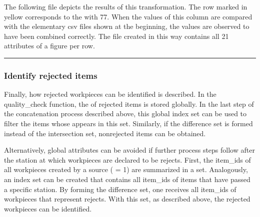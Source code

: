 \documentclass[letterpaper,10pt,english]{sphinxmanual}
\begin{document}
\sphinxAtStartPar
The following file depicts the results of this transformation. The row marked in yellow corresponds to the  with
 77. When the values of this column are compared with the elementary csv files shown at the beginning, the
values are observed to have been combined correctly. The file created in this way contains all 21 attributes of a figure
per row.



\bigskip\hrule\bigskip



\subsubsection{Identify rejected items}
\label{\detokenize{source/Examples/example04:identify-rejected}}\label{\detokenize{source/Examples/example04:identify-rejected-items}}
\sphinxAtStartPar
Finally, how rejected workpieces can be identified is described. In the quality\_check function, the  of
rejected items is stored globally. In the last step of the concatenation process described above, this global index set
can be used to filter the items whose  appears in this set. Similarly, if the difference set is formed instead
of the intersection set, nonrejected items can be obtained.

\sphinxAtStartPar
Alternatively, global attributes can be avoided if further process steps follow after the station at which workpieces
are declared to be rejects. First, the item\_ids of all workpieces created by a source ( = \sphinxhyphen{}1) are summarized
in a set. Analogously, an index set can be created that contains all item\_ids of items that have passed a specific
station. By forming the difference set, one receives all item\_ids of workpieces that represent rejects. With this set,
as described above, the rejected workpieces can be identified.


\renewcommand{\indexname}{Python Module Index}
\begin{sphinxtheindex}
\let\bigletter\sphinxstyleindexlettergroup
\bigletter{e}
\item\relax{}
\item\relax{}
\end{sphinxtheindex}

\renewcommand{\indexname}{Index}
\printindex
\end{document}
